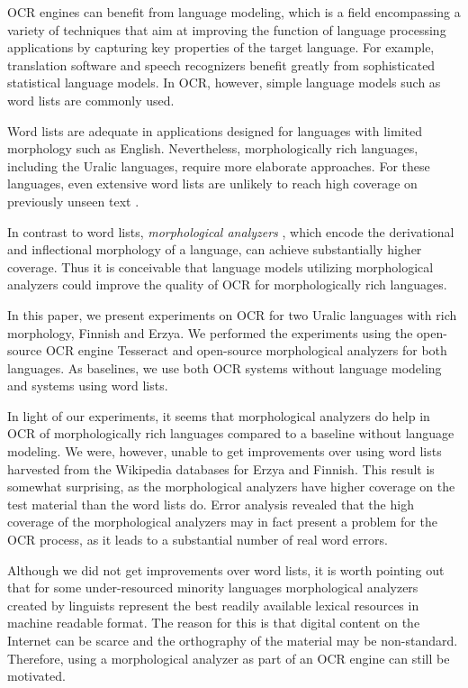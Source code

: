 \documentclass[b5paper]{article}
\begin{document}
OCR engines can benefit from language modeling, which is a field
encompassing a variety of techniques that aim at improving the
function of language processing applications by capturing key
properties of the target language. For example, translation software
and speech recognizers benefit greatly from sophisticated statistical
language models. In OCR, however, simple language models such as word
lists are commonly used.

Word lists are adequate in applications designed for languages with
limited morphology such as English. Nevertheless, morphologically rich
languages, including the Uralic languages, require more elaborate
approaches. For these languages, even extensive word lists are
unlikely to reach high coverage on previously unseen text \cite{creutz07}.

In contrast to word lists, {\it morphological analyzers}
\cite{koskenniemi83}, which encode the derivational and inflectional
morphology of a language, can achieve substantially higher
coverage. Thus it is conceivable that language models utilizing
morphological analyzers could improve the quality of OCR for
morphologically rich languages.

In this paper, we present experiments on OCR for two Uralic languages
with rich morphology, Finnish and Erzya. We performed the experiments
using the open-source OCR engine Tesseract \cite{smith07} and
open-source morphological analyzers for both languages. As baselines,
we use both OCR systems without language modeling and systems using
word lists.

In light of our experiments, it seems that morphological analyzers do
help in OCR of morphologically rich languages compared to a baseline
without language modeling. We were, however, unable to get improvements
over using word lists harvested from the Wikipedia databases for Erzya
and Finnish. This result is somewhat surprising, as the morphological
analyzers have higher coverage on the test material than the word
lists do. Error analysis revealed that the high coverage of the
morphological analyzers may in fact present a problem for the OCR
process, as it leads to a substantial number of real word errors.

Although we did not get improvements over word lists, it is worth
pointing out that for some under-resourced minority languages
morphological analyzers created by linguists represent the best
readily available lexical resources in machine readable format. The
reason for this is that digital content on the Internet can be scarce
and the orthography of the material may be non-standard. Therefore,
using a morphological analyzer as part of an OCR engine can still be
motivated.
\end{document}
